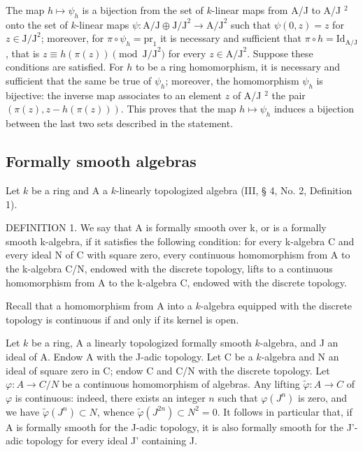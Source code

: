 The map \(h \mapsto \psi_h\) is a bijection from the set of \(k\)-linear maps from A/J to A/J \(^2\) onto the set of \(k\)-linear maps \(\psi : \text{A/J} \oplus \text{J/J}^2 \longrightarrow \text{A/J}^2\) such that \(\psi(0,z) = z\) for \(z \in \text{J/J}^2\); moreover, for \(\pi \circ \psi_h = \text{pr}_1\) it is necessary and sufficient that \(\pi \circ h = \text{Id}_{\text{A/J}}\), that is \(z \equiv h(\pi(z)) \pmod{\text{J/J}^2}\) for every \(z \in \text{A/J}^2\). Suppose these conditions are satisfied. For \(h\) to be a ring homomorphism, it is necessary and sufficient that the same be true of \(\psi_h\); moreover, the homomorphism \(\psi_h\) is bijective: the inverse map associates to an element \(z\) of A/J \(^2\) the pair \((\pi(z), z - h(\pi(z)))\). This proves that the map \(h \mapsto \psi_h\) induces a bijection between the last two sets described in the statement.

\subsection{Formally smooth algebras}

Let \(k\) be a ring and A a \(k\)-linearly topologized algebra (III, § 4, No. 2, Definition 1).

DEFINITION 1. We say that A is formally smooth over k, or is a formally smooth k-algebra, if it satisfies the following condition: for every k-algebra C and every ideal N of C with square zero, every continuous homomorphism from A to the k-algebra C/N, endowed with the discrete topology, lifts to a continuous homomorphism from A to the k-algebra C, endowed with the discrete topology.

Recall that a homomorphism from A into a \(k\)-algebra equipped with the discrete topology is continuous if and only if its kernel is open.

Let \(k\) be a ring, A a linearly topologized formally smooth \(k\)-algebra, and J an ideal of A. Endow A with the J-adic topology. Let C be a \(k\)-algebra and N an ideal of square zero in C; endow C and C/N with the discrete topology. Let \(\varphi : A \to C/N\) be a continuous homomorphism of algebras. Any lifting \(\tilde{\varphi} : A \to C\) of \(\varphi\) is continuous: indeed, there exists an integer \(n\) such that \(\varphi(J^n)\) is zero, and we have \(\tilde{\varphi}(J^n) \subset N\), whence \(\tilde{\varphi}(J^{2n}) \subset N^2 = 0\). It follows in particular that, if A is formally smooth for the J-adic topology, it is also formally smooth for the J'-adic topology for every ideal J' containing J.

